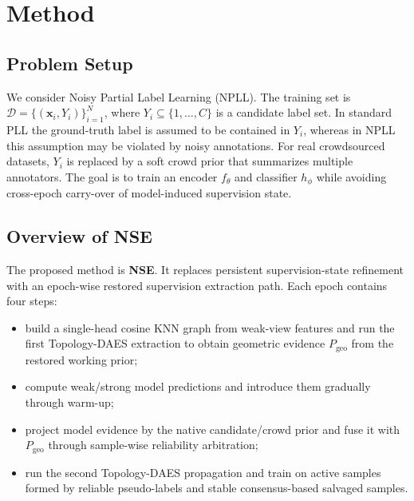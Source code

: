 
\section{Method}
\label{sec:methodology}

\subsection{Problem Setup}
We consider Noisy Partial Label Learning (NPLL). The training set is
$\mathcal{D}=\{(\mathbf{x}_i,Y_i)\}_{i=1}^{N}$, where
$Y_i\subseteq\{1,\ldots,C\}$ is a candidate label set. In standard PLL the
ground-truth label is assumed to be contained in $Y_i$, whereas in NPLL this
assumption may be violated by noisy annotations. For real crowdsourced
datasets, $Y_i$ is replaced by a soft crowd prior that summarizes multiple
annotators. The goal is to train an encoder $f_\theta$ and classifier
$h_\phi$ while avoiding cross-epoch carry-over of model-induced supervision
state.

\subsection{Overview of NSE}
The proposed method is \textbf{NSE}. It replaces persistent supervision-state
refinement with an epoch-wise restored supervision extraction path.
Each epoch contains four steps:

\begin{itemize}
    \item build a single-head cosine KNN graph from weak-view features and run
    the first Topology-DAES extraction to obtain geometric evidence
    $P_{\mathrm{geo}}$ from the restored working prior;
    \item compute weak/strong model predictions and introduce them gradually
    through warm-up;
    \item project model evidence by the native candidate/crowd prior and fuse it
    with $P_{\mathrm{geo}}$ through sample-wise reliability arbitration;
    \item run the second Topology-DAES propagation and train on active samples
    formed by reliable pseudo-labels and stable consensus-based salvaged samples.
\end{itemize}

